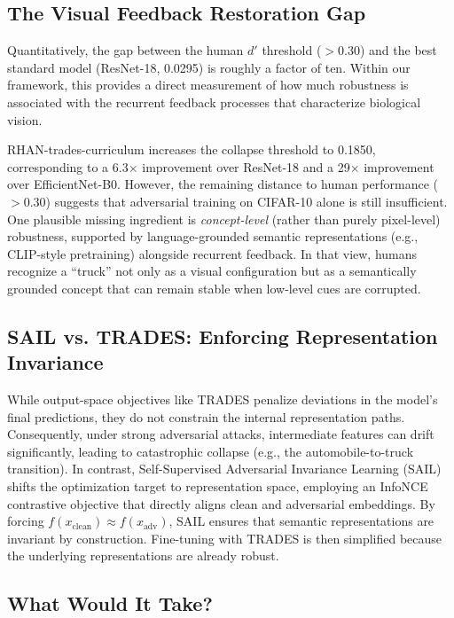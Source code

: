 \documentclass[12pt,a4paper]{article}
\begin{document}
\subsection{The Visual Feedback Restoration Gap}

Quantitatively, the gap between the human $d'$ threshold ($>0.30$) and the best
standard model (ResNet-18, 0.0295) is roughly a factor of ten. Within our
framework, this provides a direct measurement of how much robustness is
associated with the recurrent feedback processes that characterize biological
vision.

RHAN-trades-curriculum increases the collapse threshold to 0.1850, corresponding
to a 6.3$\times$ improvement over ResNet-18 and a 29$\times$ improvement over
EfficientNet-B0. However, the remaining distance to human performance
($>0.30$) suggests that adversarial training on CIFAR-10 alone is still
insufficient. One plausible missing ingredient is \emph{concept-level} (rather
than purely pixel-level) robustness, supported by language-grounded semantic
representations (e.g., CLIP-style pretraining) alongside recurrent feedback. In
that view, humans recognize a ``truck'' not only as a visual configuration but
as a semantically grounded concept that can remain stable when low-level cues are
corrupted.

\subsection{SAIL vs. TRADES: Enforcing Representation Invariance}

While output-space objectives like TRADES \citep{zhang2019theoretically} penalize deviations in the model's final predictions, they do not constrain the internal representation paths. Consequently, under strong adversarial attacks, intermediate features can drift significantly, leading to catastrophic collapse (e.g., the automobile-to-truck transition). In contrast, Self-Supervised Adversarial Invariance Learning (SAIL) shifts the optimization target to representation space, employing an InfoNCE contrastive objective \citep{oord2018representation,chen2020simclr} that directly aligns clean and adversarial embeddings. By forcing $f(x_{\text{clean}}) \approx f(x_{\text{adv}})$, SAIL ensures that semantic representations are invariant by construction. Fine-tuning with TRADES is then simplified because the underlying representations are already robust.

\subsection{What Would It Take?}
\end{document}
